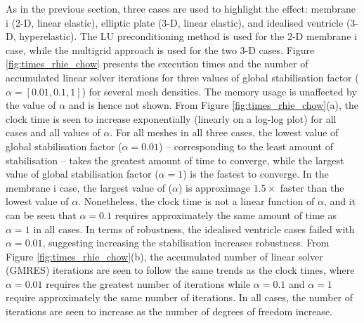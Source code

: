 \documentclass[sn-mathphys,Numbered]{sn-jnl}%
\begin{document}
 
As in the previous section, three cases are used to highlight the effect: membrane i (2-D, linear elastic), elliptic plate (3-D, linear elastic), and idealised ventricle (3-D, hyperelastic).
The LU preconditioning method is used for the 2-D membrane i case, while the multigrid approach is used for the two 3-D cases.
Figure \ref{fig:times_rhie_chow} presents the execution times and the number of accumulated linear solver iterations for three values of global stabilisation factor ($\alpha = \left[ 0.01, 0.1, 1 \right]$) for several mesh densities.
The memory usage is unaffected by the value of $\alpha$ and is hence not shown.
From Figure \ref{fig:times_rhie_chow}(a), the clock time is seen to increase exponentially (linearly on a log-log plot) for all cases and all values of $\alpha$.
For all meshes in all three cases, the lowest value of global stabilisation factor ($\alpha = 0.01$) -- corresponding to the least amount of stabilisation -- takes the greatest amount of time to converge, while the largest value of global stabilisation factor ($\alpha = 1$) is the fastest to converge.
In the membrane i case, the largest value of  ($\alpha$) is approximage $1.5\times$ faster than the lowest value of $\alpha$.
Nonetheless, the clock time is not a linear function of  $\alpha$, and it can be seen that $\alpha = 0.1$ requires approximately the same amount of time as $\alpha = 1$ in all cases.
In terms of robustness, the idealised ventricle cases failed with $\alpha = 0.01$, suggesting increasing the stabilisation increases robustness.
From Figure \ref{fig:times_rhie_chow}(b), the accumulated number of linear solver (GMRES) iterations are seen to follow the same trends as the clock times, where $\alpha = 0.01$ requires the greatest number of iterations while $\alpha = 0.1$ and $\alpha = 1$ require approximately the same number of iterations.
In all cases, the number of iterations are seen to increase as the number of degrees of freedom increase.
\end{document}
